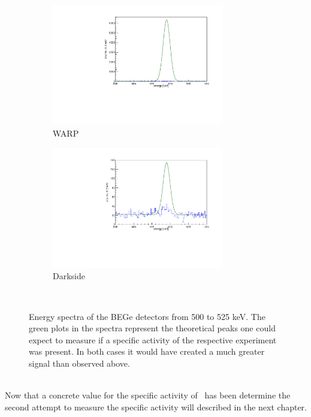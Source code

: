 \documentclass[encoding=utf8,british]{tumphthesis}
\begin{document}
\begin{figure}[t!]
	\centering
	\begin{subfigure}{.5\textwidth}
		\centering
		\includegraphics[width=75mm]{./Bilder/WARP.pdf}
		\caption{WARP}
		\label{fig:WARP}
	\end{subfigure}\hfill%
	\begin{subfigure}{.5\textwidth}
		\centering
		\includegraphics[width=75mm]{./Bilder/Darkside.pdf}
		\caption{Darkside}
		\label{fig:Darkside}
	\end{subfigure}
    \\
    \caption{
    	Energy spectra of the BEGe detectors from 500 to 525 keV.
    	The green plots in the spectra represent the theoretical peaks one could expect to measure if a specific activity of the respective experiment was present.
    	In both cases it would have created a much greater signal than observed above.
    	}
\end{figure}
\\

Now that a concrete value for the specific activity of \Kr\ has been determine the second attempt to measure the specific activity will described in the next chapter.
\\  






\end{document}
